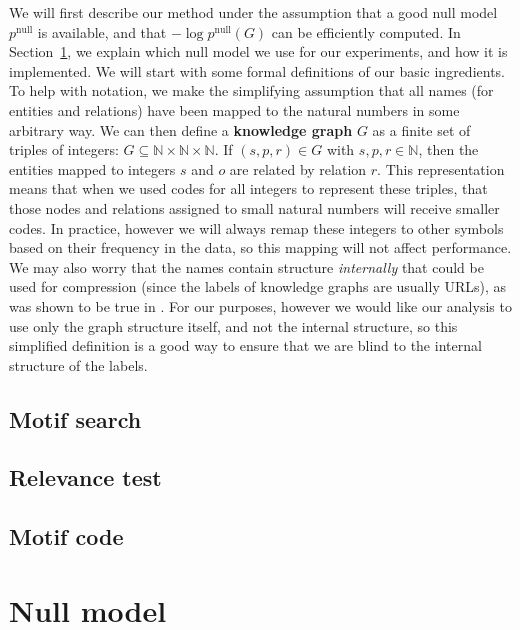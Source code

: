 \documentclass[11pt]{article}
\newcommand{\N}{{\mathbb N}}
\begin{document}
We will first describe our method under the assumption that a good null model $p^\text{null}$ is available, and that $- \log p^\text{null}(G)$ can be efficiently computed. In Section~\ref{section:null-model}, we explain which null model we use for our experiments, and how it is implemented.
We will start with some formal definitions of our basic ingredients. To help with notation, we make the simplifying assumption that all names (for entities and relations) have been mapped to the natural numbers in some arbitrary way.  We can then define a \textbf{knowledge graph} $G$ as a finite set of triples of integers: $G \subseteq \N \times\N \times \N$. If $(s, p, r) \in G$ with $s, p, r \in \N$, then the entities mapped to integers $s$ and $o$ are related by relation $r$.
This representation means that when we used codes for all integers to represent these triples, that those nodes and relations assigned to small natural numbers will receive smaller codes. In practice, however we will always remap these integers to other symbols based on their frequency in the data, so this mapping will not affect performance. We may also worry that the names contain structure \emph{internally} that could be used for compression (since the labels of knowledge graphs are usually URLs), as was shown to be true in \cite{}. For our purposes, however we would like our analysis to use only the graph structure itself, and not the internal structure, so this simplified definition is a good way to ensure that we are blind to the internal structure of the labels.

\subsection{Motif search}

\subsection{Relevance test}

\subsection{Motif code}



\section{Null model}

\label{section:null-model}
\end{document}
